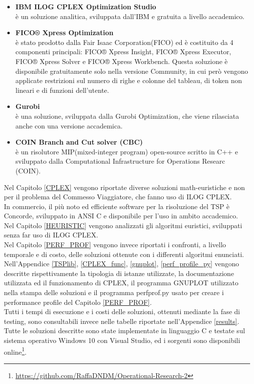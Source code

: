 \begin{itemize}
\item{\textbf{IBM ILOG CPLEX Optimization Studio}\cite{ILOG}\\
è un soluzione analitica, sviluppata dall'IBM e gratuita a livello accademico.}
\item{\textbf{FICO® Xpress Optimization}\cite{FICO}\\
è stato prodotto dalla Fair Isaac Corporation(FICO) ed è costituito da 4 componenti principali: FICO® Xpress Insight, FICO® Xpress Executor, FICO® Xpress Solver e FICO® Xpress Workbench. Questa soluzione è disponibile gratuitamente solo nella versione Community, in cui però vengono applicate restrizioni sul numero di righe e colonne del tableau, di token non lineari e di funzioni dell'utente.}
\item{\textbf{Gurobi}\cite{GUROBI}\\
è una soluzione, sviluppata dalla Gurobi Optimization, che viene rilasciata anche con una versione accademica.}
\item{\textbf{COIN Branch and Cut solver (CBC)}\cite{CBC}\\
è un risolutore MIP(mixed-integer program) open-source scritto in C++ e sviluppato dalla Computational Infrastructure for Operations Researc (COIN).}
\end{itemize}
Nel Capitolo \ref{CPLEX} vengono riportate diverse soluzioni math-euristiche e non per il problema del Commesso Viaggiatore, che fanno uso di ILOG CPLEX.\\
In commercio, il più noto ed efficiente software per la risoluzione del TSP è Concorde, sviluppato in ANSI C e disponibile per l'uso in ambito accademico\cite{concorde}.\\
Nel Capitolo \ref{HEURISTIC} vengono analizzati gli algoritmi euristici, sviluppati senza far uso di ILOG CPLEX.\\
Nel Capitolo \ref{PERF_PROF} vengono invece riportati i confronti, a livello temporale e di costo, delle soluzioni ottenute con i differenti algoritmi enunciati.\\
Nell'Appendice \ref{TSPlib}, \ref{CPLEX_func}, \ref{gnuplot}, \ref{perf_profile_py} vengono descritte rispettivamente la tipologia di istanze utilizzate, la documentazione utilizzata ed il funzionamento di CPLEX, il programma GNUPLOT utilizzato nella stampa delle soluzioni e il programma perfprof.py usato per creare i performance profile del Capitolo \ref{PERF_PROF}.\\
Tutti i tempi di esecuzione e i costi delle soluzioni, ottenuti mediante la fase di testing, sono consultabili invece nelle tabelle riportate nell'Appendice \ref{results}. Tutte le soluzioni descritte sono state implementate in linguaggio C e testate sul sistema operativo Windows 10 con Visual Studio, ed i sorgenti sono disponibili online\footnote{\url{https://github.com/RaffaDNDM/Operational-Research-2}}.